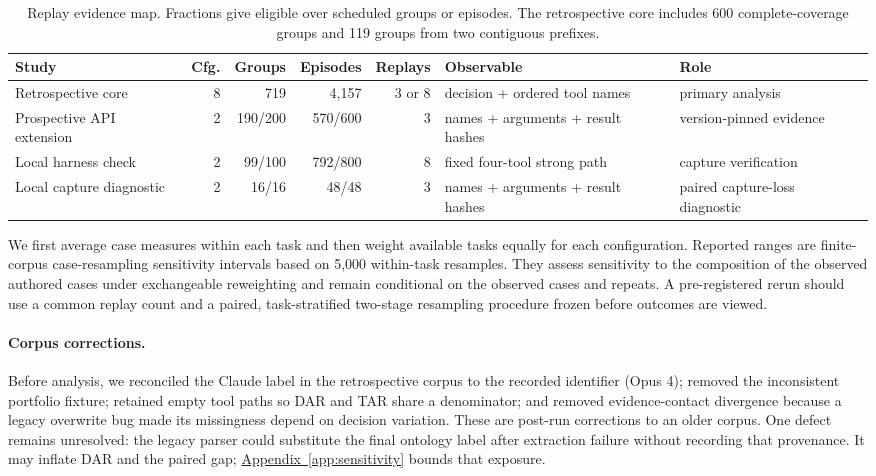 \documentclass{article}
\begin{document}
\begin{table}[t]
\caption{Replay evidence map. Fractions give eligible over scheduled groups or
episodes.  The retrospective core includes 600 complete-coverage groups and 119
groups from two contiguous prefixes.}
\label{tab:protocol-coverage}
\centering
\scriptsize
\setlength{\tabcolsep}{3.5pt}
\begin{tabular}{@{}lrrrrp{}p{}@{}}
\toprule
Study & Cfg. & Groups & Episodes & Replays & Observable & Role \\
\midrule
Retrospective core & 8 & 719 & 4,157 & 3 or 8 & decision + ordered tool names & primary analysis \\
Prospective API extension & 2 & 190/200 & 570/600 & 3 & names + arguments + result hashes & version-pinned evidence \\
Local harness check & 2 & 99/100 & 792/800 & 8 & fixed four-tool strong path & capture verification \\
Local capture diagnostic & 2 & 16/16 & 48/48 & 3 & names + arguments + result hashes & paired capture-loss diagnostic \\
\bottomrule
\end{tabular}
\end{table}

We first average case measures within each task and then weight available tasks
equally for each configuration.  Reported ranges are finite-corpus
case-resampling sensitivity intervals based on 5,000 within-task resamples.
They assess sensitivity to the composition of the observed authored cases under
exchangeable reweighting and remain conditional on the observed cases and repeats.  A pre-registered
rerun should use a common replay count and a paired, task-stratified two-stage
resampling procedure frozen before outcomes are viewed.

\paragraph{Corpus corrections.}
Before analysis, we reconciled the Claude label in the retrospective corpus to
the recorded
 identifier (Opus 4); removed the
inconsistent portfolio fixture; retained empty tool paths so DAR and TAR share
a denominator; and removed evidence-contact divergence because a legacy
overwrite bug made its missingness depend on decision variation.  These are
post-run corrections to an older corpus.  One defect remains unresolved: the
legacy parser could substitute the final ontology label after extraction
failure without recording that provenance.  It may inflate DAR and the paired
gap; \hyperref[app:sensitivity]{Appendix~\ref*{app:sensitivity}} bounds that exposure.
\end{document}
